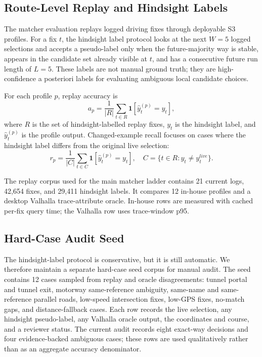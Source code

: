 \documentclass[sigconf]{acmart}
\begin{document}
\subsection{Route-Level Replay and Hindsight Labels}

The matcher evaluation replays logged driving fixes through deployable S3 profiles. For a fix \(t\), the hindsight label protocol looks at the next \(W=5\) logged selections and accepts a pseudo-label only when the future-majority way is stable, appears in the candidate set already visible at \(t\), and has a consecutive future run length of \(L=5\). These labels are not manual ground truth; they are high-confidence a posteriori labels for evaluating ambiguous local candidate choices.

For each profile \(p\), replay accuracy is
\[
a_p = \frac{1}{|R|}\sum_{t \in R}\mathbf{1}\!\left[\hat{y}^{(p)}_t = y_t\right],
\]
where \(R\) is the set of hindsight-labelled replay fixes, \(y_t\) is the hindsight label, and \(\hat{y}^{(p)}_t\) is the profile output. Changed-example recall focuses on cases where the hindsight label differs from the original live selection:
\[
r_p = \frac{1}{|C|}\sum_{t \in C}\mathbf{1}\!\left[\hat{y}^{(p)}_t = y_t\right],
\quad
C = \{t \in R : y_t \ne y^{live}_t\}.
\]

The replay corpus used for the main matcher ladder contains 21 current logs, 42,654 fixes, and 29,411 hindsight labels. It compares 12 in-house profiles and a desktop Valhalla trace-attribute oracle. In-house rows are measured with cached per-fix query time; the Valhalla row uses trace-window p95.

\subsection{Hard-Case Audit Seed}

The hindsight-label protocol is conservative, but it is still automatic. We therefore maintain a separate hard-case seed corpus for manual audit. The seed contains 12 cases sampled from replay and oracle disagreements: tunnel portal and tunnel exit, motorway same-reference ambiguity, same-name and same-reference parallel roads, low-speed intersection fixes, low-GPS fixes, no-match gaps, and distance-fallback cases. Each row records the live selection, any hindsight pseudo-label, any Valhalla oracle output, the coordinates and course, and a reviewer status. The current audit records eight exact-way decisions and four evidence-backed ambiguous cases; these rows are used qualitatively rather than as an aggregate accuracy denominator.
\end{document}
